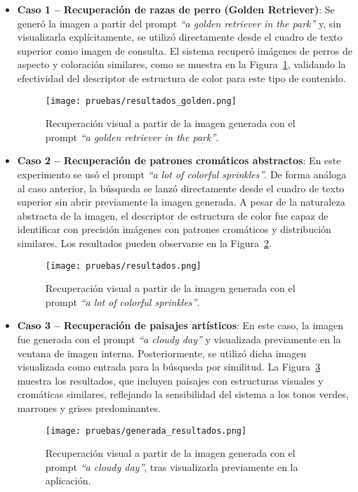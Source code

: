 \begin{itemize}
    \item \textbf{Caso 1 – Recuperación de razas de perro (Golden Retriever)}:  
    Se generó la imagen a partir del prompt \textit{``a golden retriever in the park''} y, sin visualizarla explícitamente, se utilizó directamente desde el cuadro de texto superior como imagen de consulta. El sistema recuperó imágenes de perros de aspecto y coloración similares, como se muestra en la Figura~\ref{fig:retrieval_golden}, validando la efectividad del descriptor de estructura de color para este tipo de contenido.

    \begin{figure}[H]
        \centering
        \texttt{[image: pruebas/resultados\_golden.png]}
        \caption{Recuperación visual a partir de la imagen generada con el prompt \textit{``a golden retriever in the park''}.}
        \label{fig:retrieval_golden}
    \end{figure}

    \item \textbf{Caso 2 – Recuperación de patrones cromáticos abstractos}:  
    En este experimento se usó el prompt \textit{``a lot of colorful sprinkles''}. De forma análoga al caso anterior, la búsqueda se lanzó directamente desde el cuadro de texto superior sin abrir previamente la imagen generada. A pesar de la naturaleza abstracta de la imagen, el descriptor de estructura de color fue capaz de identificar con precisión imágenes con patrones cromáticos y distribución similares. Los resultados pueden observarse en la Figura~\ref{fig:retrieval_sprinkles}.

    \begin{figure}[H]
        \centering
        \texttt{[image: pruebas/resultados.png]}
        \caption{Recuperación visual a partir de la imagen generada con el prompt \textit{``a lot of colorful sprinkles''}.}
        \label{fig:retrieval_sprinkles}
    \end{figure}

    \item \textbf{Caso 3 – Recuperación de paisajes artísticos}:  
    En este caso, la imagen fue generada con el prompt \textit{``a cloudy day''} y visualizada previamente en la ventana de imagen interna. Posteriormente, se utilizó dicha imagen visualizada como entrada para la búsqueda por similitud. La Figura~\ref{fig:retrieval_cloudy} muestra los resultados, que incluyen paisajes con estructuras visuales y cromáticas similares, reflejando la sensibilidad del sistema a los tonos verdes, marrones y grises predominantes.
    \begin{figure}[H]
        \centering
        \texttt{[image: pruebas/generada\_resultados.png]}
        \caption{Recuperación visual a partir de la imagen generada con el prompt \textit{``a cloudy day''}, tras visualizarla previamente en la aplicación.}
        \label{fig:retrieval_cloudy}
    \end{figure}

\end{itemize}

